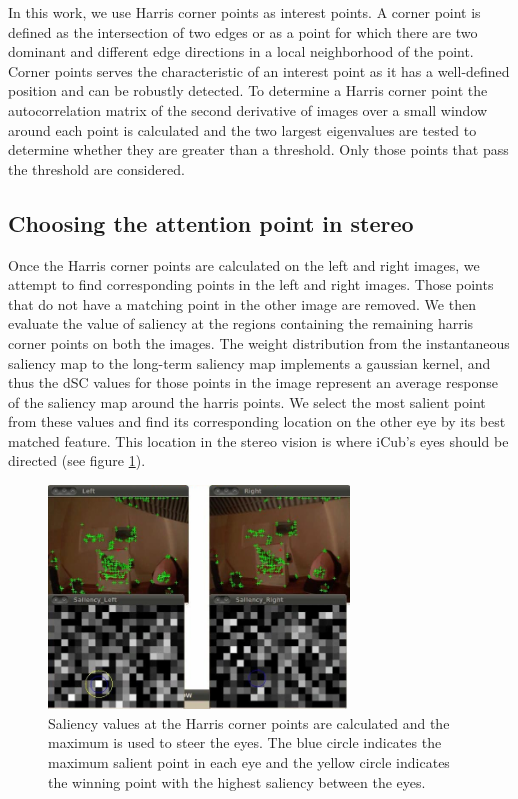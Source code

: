 \documentclass[conference]{IEEEtran}
\begin{document}
In this work, we use Harris corner points as interest points. A corner
point is defined as the intersection of two edges or as a point for
which there are two dominant and different edge directions in a local
neighborhood of the point. Corner points serves the characteristic of
an interest point as it has a well-defined position and can be
robustly detected. To determine a Harris corner point the
autocorrelation matrix of the second derivative of images over a small
window around each point is calculated and the two largest eigenvalues
are tested to determine whether they are greater than a
threshold. Only those points that pass the threshold are considered.

\subsection{Choosing the attention point in stereo}
Once the Harris corner points are calculated on the left and right
images, we attempt to find corresponding points in the left and right
images. Those points that do not have a matching point in the other
image are removed. We then evaluate the value of saliency at the
regions containing the remaining harris corner points on both the
images. The weight distribution from the instantaneous saliency map to
the long-term saliency map implements a gaussian kernel, and thus the
dSC values for those points in the image represent an average response
of the saliency map around the harris points. We select the most
salient point from these values and find its corresponding location on
the other eye by its best matched feature. This location in the stereo
vision is where iCub's eyes should be directed (see figure
\ref{fig:saliency_harris}).

\begin{figure} [!tbp]
\centering
\includegraphics[width=8.0cm]{saliency_harris.jpg}
\caption{Saliency values at the Harris corner points are calculated
  and the maximum is used to steer the eyes. The blue circle indicates
  the maximum salient point in each eye and the yellow circle
  indicates the winning point with the highest saliency between the
  eyes.}
\label{fig:saliency_harris}
\end{figure}
\end{document}
